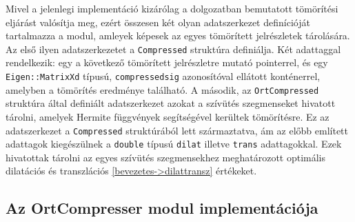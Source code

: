 \documentclass[oneside,titlepage,12pt,a4paper]{report}
\begin{document}
\par Mivel a jelenlegi implementáció kizárólag a dolgozatban bemutatott tömörítési eljárást valósítja meg, ezért összesen két olyan adatszerkezet definícióját tartalmazza a modul, amleyek képesek az egyes tömörített jelrészletek tárolására. Az első ilyen adatszerkezetet a \texttt{Compressed} struktúra definiálja. Két adattaggal rendelkezik: egy a következő tömörített jelrészletre mutató pointerrel, és egy \texttt{Eigen::MatrixXd} típusú, \texttt{compressedsig} azonosítóval ellátott konténerrel, amelyben a tömörítés eredménye található. A második, az \texttt{OrtCompressed} struktúra által definiált adatszerkezet azokat a szívütés szegmenseket hivatott tárolni, amelyek Hermite függvények segítségével kerültek tömörítésre. Ez az adatszerkezet a \texttt{Compressed} struktúrából lett származtatva, ám az előbb említett adattagok kiegészülnek a \texttt{double} típusú \texttt{dilat} illetve \texttt{trans} adattagokkal. Ezek hivatottak tárolni az egyes szívütés szegmensekhez meghatározott optimális dilatációs és transzlációs \ref{bevezetes->dilattransz} értékeket.     

\subsection{Az OrtCompresser modul implementációja}
\end{document}

